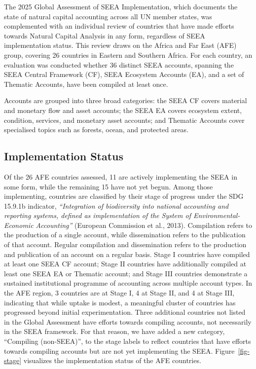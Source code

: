 \documentclass[
  letterpaper,
  DIV=11,
  numbers=noendperiod]{scrartcl}
\begin{document}
The 2025 Global Assessment of SEEA Implementation, which documents the
state of natural capital accounting across all UN member states, was
complemented with an individual review of countries that have made
efforts towards Natural Capital Analysis in any form, regardless of SEEA
implementation status. This review draws on the Africa and Far East
(AFE) group, covering 26 countries in Eastern and Southern Africa. For
each country, an evaluation was conducted whether 36 distinct SEEA
accounts, spanning the SEEA Central Framework (CF), SEEA Ecosystem
Accounts (EA), and a set of Thematic Accounts, have been compiled at
least once.

Accounts are grouped into three broad categories: the SEEA CF covers
material and monetary flow and asset accounts; the SEEA EA covers
ecosystem extent, condition, services, and monetary asset accounts; and
Thematic Accounts cover specialised topics such as forests, ocean, and
protected areas.

\subsection{Implementation Status}\label{implementation-status}

Of the 26 AFE countries assessed, 11 are actively implementing the SEEA
in some form, while the remaining 15 have not yet begun. Among those
implementing, countries are classified by their stage of progress under
the SDG 15.9.1b indicator, \emph{``Integration of biodiversity into
national accounting and reporting systems, defined as implementation of
the System of Environmental-Economic Accounting''} (European Commission
et al., 2013). Compilation refers to the production of a single account,
while dissemination refers to the publication of that account. Regular
compilation and dissemination refers to the production and publication
of an account on a regular basis. Stage I countries have compiled at
least one SEEA CF account; Stage II countries have additionally compiled
at least one SEEA EA or Thematic account; and Stage III countries
demonstrate a sustained institutional programme of accounting across
multiple account types. In the AFE region, 3 countries are at Stage I, 4
at Stage II, and 4 at Stage III, indicating that while uptake is modest,
a meaningful cluster of countries has progressed beyond initial
experimentation. Three additional countries not listed in the Global
Assessment have efforts towards compiling accounts, not necessarily in
the SEEA framework. For that reason, we have added a new category,
``Compiling (non-SEEA)'', to the stage labels to reflect countries that
have efforts towards compiling accounts but are not yet implementing the
SEEA. Figure~\ref{fig-stage} visualizes the implementation status of the
AFE countries.
\end{document}
